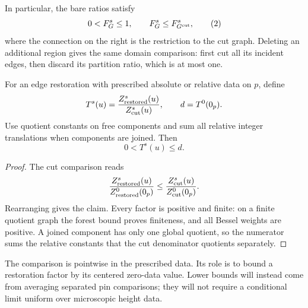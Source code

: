In particular, the bare ratios satisfy
\begin{equation}
                 0<F_G^s\le1,\qquad F_G^s\le F_{G^{\rm cut}}^s,
 \tag{2}\label{eq:source-2}
\end{equation}
where the connection on the right is the restriction to the cut
graph. Deleting an additional region gives the same domain
comparison: first cut all its incident edges, then discard its
partition ratio, which is at most one.

\begin{corollary}\label{heights:restoration}
For an edge restoration with prescribed absolute or relative data
on \(p\), define
\[
       T^s(u)=\frac{Z_{\rm restored}^s(u)}{Z_{\rm cut}^s(u)},
       \qquad d=T^0(0_p).
\]
Use quotient constants on free components and sum all relative
integer translations when components are joined. Then
\[
                            0<T^s(u)\le d.
\]
\end{corollary}

\begin{proof}
The cut comparison reads
\[
 \frac{Z_{\rm restored}^s(u)}{Z_{\rm restored}^0(0_p)}
 \le
 \frac{Z_{\rm cut}^s(u)}{Z_{\rm cut}^0(0_p)}.
\]
Rearranging gives the claim. Every factor is positive and finite:
on a finite quotient graph the forest bound proves finiteness, and
all Bessel weights are positive. A joined component has only one
global quotient, so the numerator sums the relative constants that
the cut denominator quotients separately.
\end{proof}

The comparison is pointwise in the prescribed data. Its role is to
bound a restoration factor by its centered zero-data value. Lower
bounds will instead come from averaging separated pin comparisons;
they will not require a conditional limit uniform over microscopic
height data.
